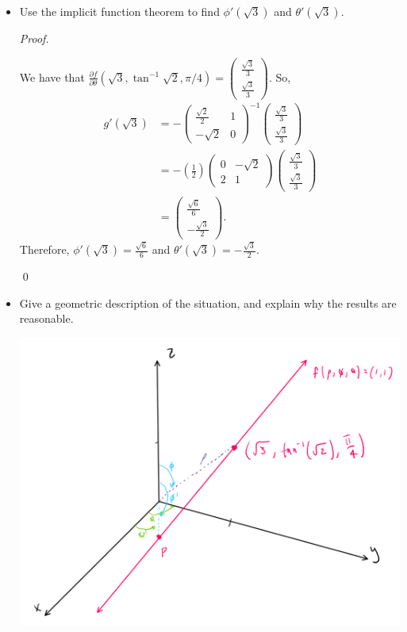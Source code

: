 \documentclass[12pt]{article}
\newenvironment{problem}[2][Problem]{\begin{trivlist}
\item[\hskip \labelsep {\bfseries #1}\hskip \labelsep {\bfseries
#2.}]}{\end{trivlist}}
\newenvironment{sol}
    {\emph{Proof.}
    }
    {
    \qed
    }
\begin{document}
\begin{problem}{23}
\begin{itemize}
    \item[(b)] Use the implicit function theorem to find $\phi'(\sqrt{3})$ and $\theta'(\sqrt{3})$.
    
    \begin{sol}
    We have that $\frac{\partial f}{\partial \theta}(\sqrt{3},\tan^{-1}\sqrt{2}, \pi/4) = \begin{pmatrix} \frac{\sqrt{3}}{3} \\ \frac{\sqrt{3}}{3} \end{pmatrix}$. So, \begin{align*}
        g'(\sqrt{3}) &= -\begin{pmatrix}
\frac{\sqrt{2}}{2} & 1 \\ 
-\sqrt{2} & 0
\end{pmatrix}^{-1} \begin{pmatrix} \frac{\sqrt{3}}{3} \\ \frac{\sqrt{3}}{3} \end{pmatrix} \\ &= -\left( \frac{1}{2} \right)\begin{pmatrix}
0 & -\sqrt{2} \\ 
2 & 1
\end{pmatrix}\begin{pmatrix} \frac{\sqrt{3}}{3} \\ \frac{\sqrt{3}}{3} \end{pmatrix} \\ &= \begin{pmatrix} \frac{\sqrt{6}}{6} \\ -\frac{\sqrt{3}}{2} \end{pmatrix}.
    \end{align*}
    Therefore, $\phi'(\sqrt{3}) = \frac{\sqrt{6}}{6}$ and $\theta'(\sqrt{3}) = -\frac{\sqrt{3}}{2}$.
    \end{sol}
    
    \item[(c)] Give a geometric description of the situation, and explain why the results are reasonable.
    
    \begin{center}
    \includegraphics[scale=.5]{hw 6 (1).PNG}
    \end{center}
    

\end{itemize}
\end{problem}
\end{document}
